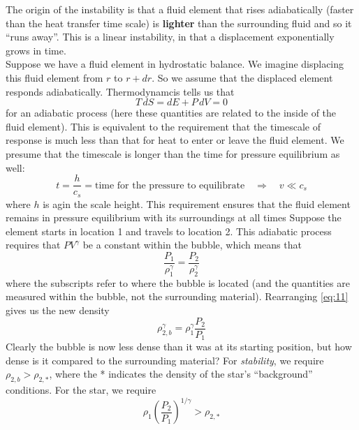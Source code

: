 \documentclass[10pt]{article}
\numberwithin{equation}{section}
\newcommand{\n}{\noindent}
\begin{document}
\n The origin of the instability is that a fluid element that rises
adiabatically (faster than the heat transfer time scale) is
\textbf{lighter} than the surrounding fluid and so it
``runs away''. This is a linear instability, in that a displacement
exponentially grows in time. \\

\n Suppose we have a fluid element in hydrostatic balance. We imagine
displacing this fluid element from $r$ to $r+dr$. So we assume that
the displaced element responds adiabatically. Thermodynamcis tells us
that
\begin{equation}
  \label{eq:9}
  T\,dS=dE+P\,dV=0
\end{equation}
for an adiabatic process (here these quantities are related to the
inside of the fluid element). This is equivalent to the requirement that
the timescale of response is much less than that for heat to enter or
leave the fluid element. We presume that the timescale is longer than
the time for pressure equilibrium as well:
\begin{equation}
  \label{eq:10}
  t=\frac{h}{c_s}=\textrm{time for the pressure to
    equilibrate}\quad\Rightarrow\quad v\ll c_s
\end{equation}
where $h$ is agin the scale height. This requirement ensures that the
fluid element remains in pressure equilibrium with its surroundings at
all times Suppose the element starts in
location 1 and travels to location 2. This adiabatic process requires
that $PV^\gamma$ be a constant within the bubble, which means that
\begin{equation}
  \label{eq:11}
  \frac{P_1}{\rho_1^\gamma}=\frac{P_2}{\rho_2^\gamma}
\end{equation}
where the subscripts refer to where the bubble is located (and the
quantities are measured within the bubble, not the surrounding
material). Rearranging
\eqref{eq:11} gives us the new density
\begin{equation}
  \label{eq:12}
  \rho_{2,b}^\gamma=\rho_1^\gamma\frac{P_2}{P_1}
\end{equation}
Clearly the bubble is now less dense than it was at its starting
position, but how dense is it compared to the surrounding material?
For \emph{stability}, we require $\rho_{2,b}>\rho_{2,*}$, where the * indicates the
density of the star's ``background'' conditions. For the star, we
require
\begin{equation}
  \label{eq:13}
  \rho_1\left(\frac{P_2}{P_1}\right)^{1/\gamma}>\rho_{2,*}
\end{equation}
\end{document}

